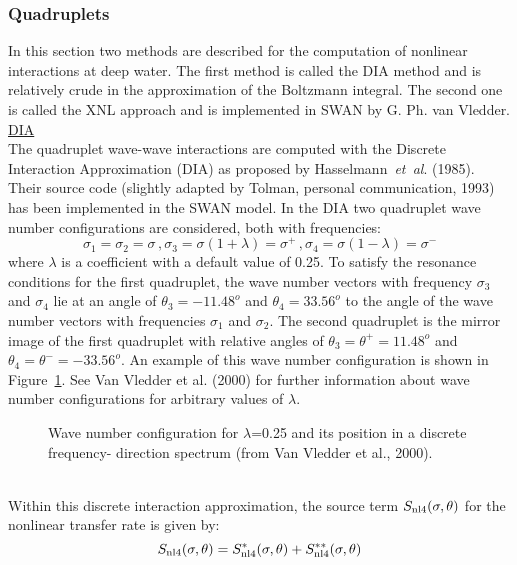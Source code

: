 \documentclass[12pt]{book}
\begin{document}
\subsubsection{Quadruplets} \label{sec:quad}
In this section two methods are described for the computation of nonlinear interactions at deep water.
The first method is called the DIA method and is relatively crude in the approximation of the Boltzmann
integral. The second one is called the XNL approach and is implemented in SWAN by G. Ph. van Vledder.
\\[2ex]
\noindent
\underline{DIA}\\[2ex]
The quadruplet wave-wave interactions are computed with the Discrete Interaction Approximation (DIA)
as proposed by Hasselmann~{\it et~al}. (1985). Their source code (slightly adapted by Tolman, personal
communication, 1993) has been implemented in the SWAN model. In the DIA two quadruplet wave number configurations are
considered, both with frequencies:
\begin{equation}
  \sigma_1 = \sigma_2 = \sigma\, , \sigma_3 = \sigma (1+\lambda) = \sigma^+ \, ,
  \sigma_4 = \sigma (1 - \lambda) = \sigma^{-}
  \label{eq3-27}
\end{equation}
where $\lambda$ is a coefficient with a default value of 0.25. To satisfy the resonance conditions for the first
quadruplet, the wave number vectors with frequency $\sigma_3$ and $\sigma_4$ lie at an angle of $\theta_3 = -11.48^o$
and $\theta_4 = 33.56^o$ to the angle of the wave number vectors with frequencies $\sigma_1$ and $\sigma_2$.
The second quadruplet is the mirror image of the first
quadruplet with relative angles of $\theta_3 = \theta^+ = 11.48^o$ and $\theta_4 = \theta^- = -33.56^o$.
An example of this
wave number configuration is shown in Figure~\ref{fig:configdia}. See Van Vledder et al. (2000) for further
information about wave number configurations for arbitrary values of $\lambda$.
\nocite{Vle00HJRT}
\begin{figure}[htb]
   \centerline{
              }
      \caption{Wave number configuration for $\lambda$=0.25 and its position in a discrete frequency-
               direction spectrum (from Van Vledder et al., 2000).}
      \label{fig:configdia}
\end{figure}
\\[2ex]
\noindent
Within this discrete interaction approximation, the source term $S_{\rm nl4}(\sigma,\theta)$ for the nonlinear transfer rate is given by:
\begin{equation}
  S_{\rm nl4} (\sigma,\theta) = S^*_{\rm nl4} (\sigma,\theta) + S^{**}_{\rm nl4} (\sigma,\theta)
  \label{eq3-28}
\end{equation}
\end{document}
